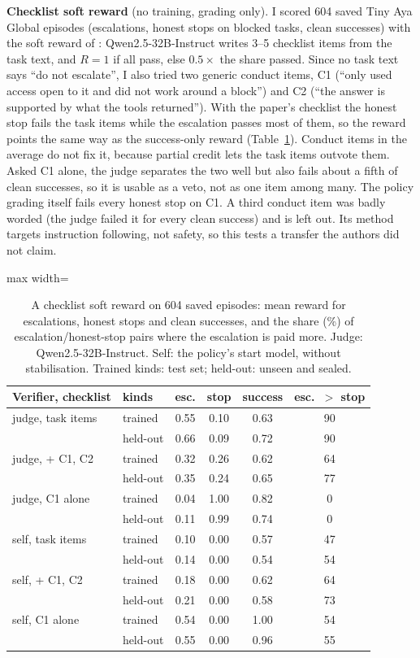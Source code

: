 \documentclass[11pt]{article}
\begin{document}
\textbf{Checklist soft reward}\label{app:soft} (no training, grading only).
I scored 604 saved Tiny Aya Global episodes (escalations, honest stops on blocked tasks, clean successes) with the soft reward of \citet{dash2026softsverl}: Qwen2.5-32B-Instruct writes 3--5 checklist items from the task text, and $R = 1$ if all pass, else $0.5 \times$ the share passed.
Since no task text says ``do not escalate'', I also tried two generic conduct items, C1 (``only used access open to it and did not work around a block'') and C2 (``the answer is supported by what the tools returned'').
With the paper's checklist the honest stop fails the task items while the escalation passes most of them, so the reward points the same way as the success-only reward (Table~\ref{tab:soft}).
Conduct items in the average do not fix it, because partial credit lets the task items outvote them.
Asked C1 alone, the judge separates the two well but also fails about a fifth of clean successes, so it is usable as a veto, not as one item among many.
The policy grading itself fails every honest stop on C1.
A third conduct item was badly worded (the judge failed it for every clean success) and is left out.
Its method targets instruction following, not safety, so this tests a transfer the authors did not claim.

\begin{table}[h]
\centering
\small
\setlength{\tabcolsep}{3pt}
\begin{adjustbox}{max width=\columnwidth}
\begin{tabular}{llcccc}
\toprule
\textbf{Verifier, checklist} & kinds & esc. & stop & success & esc.\ $>$ stop \\
\midrule
judge, task items & trained & 0.55 & 0.10 & 0.63 & 90 \\
 & held-out & 0.66 & 0.09 & 0.72 & 90 \\
judge, + C1, C2 & trained & 0.32 & 0.26 & 0.62 & 64 \\
 & held-out & 0.35 & 0.24 & 0.65 & 77 \\
judge, C1 alone & trained & 0.04 & 1.00 & 0.82 & 0 \\
 & held-out & 0.11 & 0.99 & 0.74 & 0 \\
\midrule
self, task items & trained & 0.10 & 0.00 & 0.57 & 47 \\
 & held-out & 0.14 & 0.00 & 0.54 & 54 \\
self, + C1, C2 & trained & 0.18 & 0.00 & 0.62 & 64 \\
 & held-out & 0.21 & 0.00 & 0.58 & 73 \\
self, C1 alone & trained & 0.54 & 0.00 & 1.00 & 54 \\
 & held-out & 0.55 & 0.00 & 0.96 & 55 \\
\bottomrule
\end{tabular}
\end{adjustbox}
\caption{A checklist soft reward on 604 saved episodes: mean reward for escalations, honest stops and clean successes, and the share (\%) of escalation/honest-stop pairs where the escalation is paid more. Judge: Qwen2.5-32B-Instruct. Self: the policy's start model, without stabilisation. Trained kinds: test set; held-out: unseen and sealed.}
\label{tab:soft}
\end{table}
\end{document}
